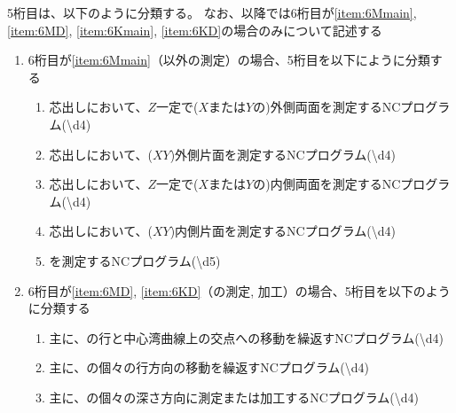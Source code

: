 \clearpage
5桁目は、以下のように分類する。
なお、以降では6桁目が\ref{item:6Mmain}, \ref{item:6MD}, \ref{item:6Kmain}, \ref{item:6KD}の場合のみについて記述する
\begin{enumerate}[label=\alph*)]
\item 6桁目が\ref{item:6Mmain}（\Dimple 以外の測定）の場合、5桁目を以下にように分類する
  \begin{enumerate}[label=\arabic*., ref=\arabic*, start=1]
  \item%
    芯出しにおいて、$Z$一定で($X$または$Y$の)外側両面を測定するNCプログラム({\textbackslash d{4}})
  \item%
    芯出しにおいて、($XY$)外側片面を測定するNCプログラム({\textbackslash d{4}})
  \item%
    芯出しにおいて、$Z$一定で($X$または$Y$の)内側両面を測定するNCプログラム({\textbackslash d{4}})
  \item%
    芯出しにおいて、($XY$)内側片面を測定するNCプログラム({\textbackslash d{4}})
  \item%
    \CenterlineEndFaceDif を測定するNCプログラム({\textbackslash d{5}})
  \end{enumerate}
\item 6桁目が\ref{item:6MD}, \ref{item:6KD}（\Dimple の測定, 加工）の場合、5桁目を以下のように分類する
  \begin{enumerate}[label=\arabic*., ref=\arabic*]
  \item 主に、\Dimple の行と中心湾曲線上の交点への移動を繰返すNCプログラム({\textbackslash d{4}})
  \item 主に、\Dimple の個々の行方向の移動を繰返すNCプログラム({\textbackslash d{4}})
  \item 主に、\Dimple の個々の深さ方向に測定または加工するNCプログラム({\textbackslash d{4}})
  \end{enumerate}

\end{enumerate}
